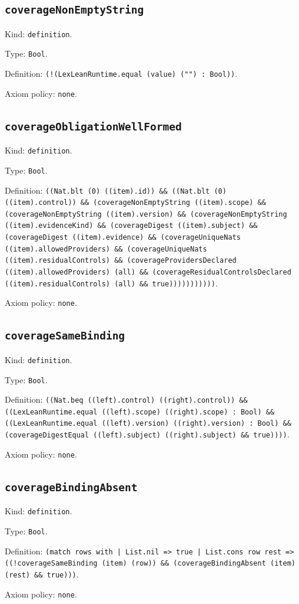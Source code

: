 \documentclass[11pt]{article}
\begin{document}
\subsection*{\texttt{coverageNonEmptyString}}
\noindent Kind: \texttt{definition}.\par
\noindent Type: \texttt{Bool}.\par
\noindent Definition: \texttt{(!(LexLeanRuntime.equal (value) ("") : Bool))}.\par
\noindent Axiom policy: \texttt{none}.\par
\subsection*{\texttt{coverageObligationWellFormed}}
\noindent Kind: \texttt{definition}.\par
\noindent Type: \texttt{Bool}.\par
\noindent Definition: \texttt{((Nat.blt (0) ((item).id)) \&\& ((Nat.blt (0) ((item).control)) \&\& (coverageNonEmptyString ((item).scope) \&\& (coverageNonEmptyString ((item).version) \&\& (coverageNonEmptyString ((item).evidenceKind) \&\& (coverageDigest ((item).subject) \&\& (coverageDigest ((item).evidence) \&\& (coverageUniqueNats ((item).allowedProviders) \&\& (coverageUniqueNats ((item).residualControls) \&\& (coverageProvidersDeclared ((item).allowedProviders) (all) \&\& (coverageResidualControlsDeclared ((item).residualControls) (all) \&\& true)))))))))))}.\par
\noindent Axiom policy: \texttt{none}.\par
\subsection*{\texttt{coverageSameBinding}}
\noindent Kind: \texttt{definition}.\par
\noindent Type: \texttt{Bool}.\par
\noindent Definition: \texttt{((Nat.beq ((left).control) ((right).control)) \&\& ((LexLeanRuntime.equal ((left).scope) ((right).scope) : Bool) \&\& ((LexLeanRuntime.equal ((left).version) ((right).version) : Bool) \&\& (coverageDigestEqual ((left).subject) ((right).subject) \&\& true))))}.\par
\noindent Axiom policy: \texttt{none}.\par
\subsection*{\texttt{coverageBindingAbsent}}
\noindent Kind: \texttt{definition}.\par
\noindent Type: \texttt{Bool}.\par
\noindent Definition: \texttt{(match rows with | List.nil => true | List.cons row rest => ((!coverageSameBinding (item) (row)) \&\& (coverageBindingAbsent (item) (rest) \&\& true)))}.\par
\noindent Axiom policy: \texttt{none}.\par
\end{document}
